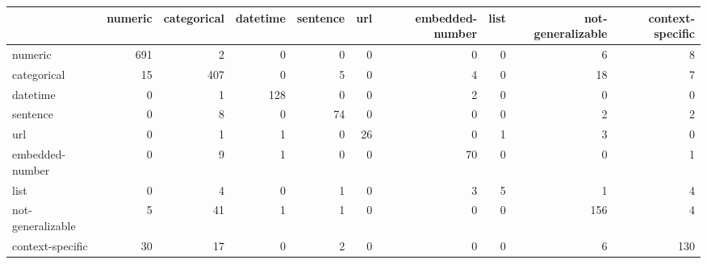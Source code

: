 \begin{tabular}{lrrrrrrrrr}
\toprule
{} &  numeric &  categorical &  datetime &  sentence &  url &  embedded-number &  list &  not-generalizable &  context-specific \\
\midrule
numeric           &      691 &            2 &         0 &         0 &    0 &                0 &     0 &                  6 &                 8 \\
categorical       &       15 &          407 &         0 &         5 &    0 &                4 &     0 &                 18 &                 7 \\
datetime          &        0 &            1 &       128 &         0 &    0 &                2 &     0 &                  0 &                 0 \\
sentence          &        0 &            8 &         0 &        74 &    0 &                0 &     0 &                  2 &                 2 \\
url               &        0 &            1 &         1 &         0 &   26 &                0 &     1 &                  3 &                 0 \\
embedded-number   &        0 &            9 &         1 &         0 &    0 &               70 &     0 &                  0 &                 1 \\
list              &        0 &            4 &         0 &         1 &    0 &                3 &     5 &                  1 &                 4 \\
not-generalizable &        5 &           41 &         1 &         1 &    0 &                0 &     0 &                156 &                 4 \\
context-specific  &       30 &           17 &         0 &         2 &    0 &                0 &     0 &                  6 &               130 \\
\bottomrule
\end{tabular}
